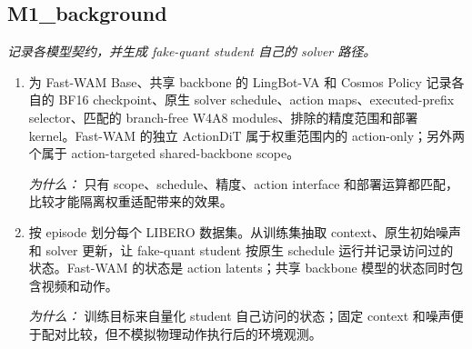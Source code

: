 \documentclass[10pt,a4paper]{article}
\begin{document}
\subsection*{M1\_background}
\emph{记录各模型契约，并生成 fake-quant student 自己的 solver 路径。}
\begin{enumerate}[leftmargin=*,start=1]
  \item 为 Fast-WAM Base、共享 backbone 的 LingBot-VA 和 Cosmos Policy 记录各自的 BF16 checkpoint、原生 solver schedule、action maps、executed-prefix selector、匹配的 branch-free W4A8 modules、排除的精度范围和部署 kernel。Fast-WAM 的独立 ActionDiT 属于权重范围内的 action-only；另外两个属于 action-targeted shared-backbone scope。
\par\emph{为什么：} 只有 scope、schedule、精度、action interface 和部署运算都匹配，比较才能隔离权重适配带来的效果。
  \item 按 episode 划分每个 LIBERO 数据集。从训练集抽取 context、原生初始噪声和 solver 更新，让 fake-quant student 按原生 schedule 运行并记录访问过的状态。Fast-WAM 的状态是 action latents；共享 backbone 模型的状态同时包含视频和动作。
\par\emph{为什么：} 训练目标来自量化 student 自己访问的状态；固定 context 和噪声便于配对比较，但不模拟物理动作执行后的环境观测。
\end{enumerate}
\end{document}
